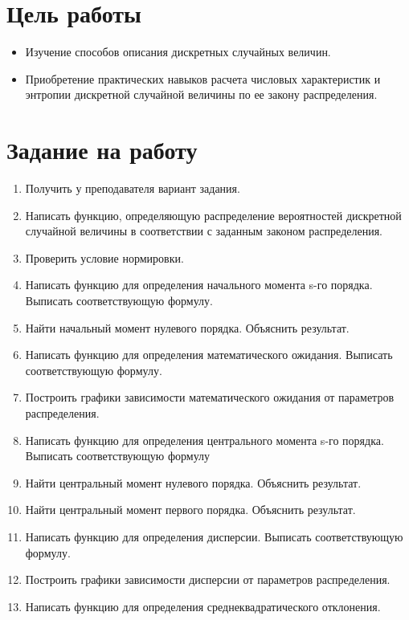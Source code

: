 \documentclass[a4paper,14pt]{extarticle}
\begin{document}

\section{Цель работы}
\begin{itemize}
    \item Изучение способов описания дискретных случайных величин.
    \item Приобретение практических навыков расчета числовых характеристик
          и энтропии дискретной случайной величины по ее закону распределения.
\end{itemize}

\section{Задание на работу}
\begin{enumerate}
    \item Получить у преподавателя вариант задания.
    \item Написать функцию, определяющую распределение вероятностей
          дискретной случайной величины в соответствии с заданным
          законом распределения.
    \item Проверить условие нормировки.
    \item Написать функцию для определения начального момента s-го порядка.
          Выписать соответствующую формулу.
    \item Найти начальный момент нулевого порядка. Объяснить результат.
    \item Написать функцию для определения математического ожидания.
          Выписать соответствующую формулу.
    \item Построить графики зависимости математического ожидания от параметров
          распределения.
    \item Написать функцию для определения центрального момента s-го порядка.
          Выписать соответствующую формулу
    \item Найти центральный момент нулевого порядка. Объяснить результат.
    \item Найти центральный момент первого порядка. Объяснить результат.
    \item Написать функцию для определения дисперсии. Выписать
          соответствующую формулу.
    \item Построить графики зависимости дисперсии от параметров распределения.
    \item Написать функцию для определения среднеквадратического отклонения.

\end{enumerate}
\end{document}
